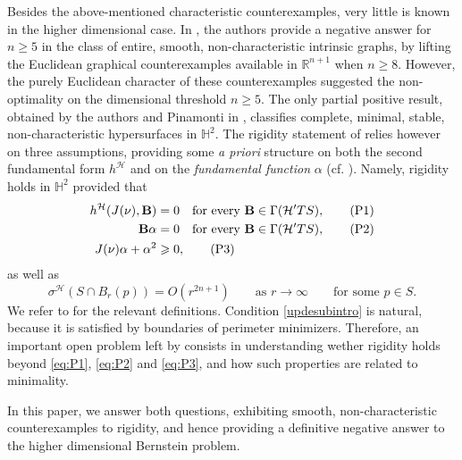 \documentclass[11pt]{amsart}
\renewcommand{\geq}{\geqslant}
\newcommand{\hhh}{{\mathcal{H}}}
\newcommand{\vh}{\nu}
\newcommand{\rr}{{\mathbb{R}}}
\newcommand{\hh}{{\mathbb{H}}}
\newcommand{\B}{\mathbf{B}}
\theoremstyle{definition}
\theoremstyle{remark}
\numberwithin{equation}{section}
\begin{document}
\medskip
Besides the above-mentioned characteristic counterexamples, very little is known in the higher dimensional case. 
In \cite{MR2333095}, the authors provide a negative answer for $n\geq 5$ in the class of entire, smooth, non-characteristic intrinsic graphs, by lifting the Euclidean graphical counterexamples available in $\rr^{n+1}$ when $n\geq 8$. However, the purely Euclidean character of these counterexamples suggested the non-optimality on the dimensional threshold $n\geq 5$. 
The only partial positive result, obtained by the authors and Pinamonti in \cite{simons}, classifies complete, minimal, stable, non-characteristic hypersurfaces in $\hh^2$. The rigidity statement of \cite{simons} relies however on three assumptions, providing some \emph{a priori} structure on both the second fundamental form $ h^\hhh$ and on the \emph{fundamental function} $\alpha$ (cf. ). Namely, rigidity holds in $\hh^2$ provided that  
\begin{align}
  h^\hhh(J(\vh),\B)&=0\quad\text{for every }\B\in\Gamma(\hhh'TS),\label{eq:P1}\tag{$\mathrm{P}1$}\\
 \B\alpha&=0\quad\text{for every }\B\in\Gamma(\hhh'TS),\label{eq:P2}\tag{$\mathrm{P}2$}\\
J(\nu)\alpha+\alpha^2&\geq 0,\label{eq:P3}\tag{$\mathrm{P}3$}
\end{align}
as well as
\begin{equation}\label{updesubintro}
     \sigma^\hhh(S\cap B_r(p))=O\left(r^{2n+1}\right)\qquad\text{as }r\to\infty\qquad\text{for some $p\in S$}.
\end{equation}
We refer to  for the relevant definitions. Condition \eqref{updesubintro} is natural, because it is satisfied by boundaries of perimeter minimizers. Therefore, an important open problem left by \cite{simons} consists in understanding wether rigidity holds beyond \eqref{eq:P1}, \eqref{eq:P2} and \eqref{eq:P3}, and how such properties are related to minimality.

\medskip
In this paper, we answer both questions, exhibiting smooth, non-characteristic counterexamples to rigidity, and hence providing a definitive negative answer to the higher dimensional Bernstein problem. 
\end{document}
